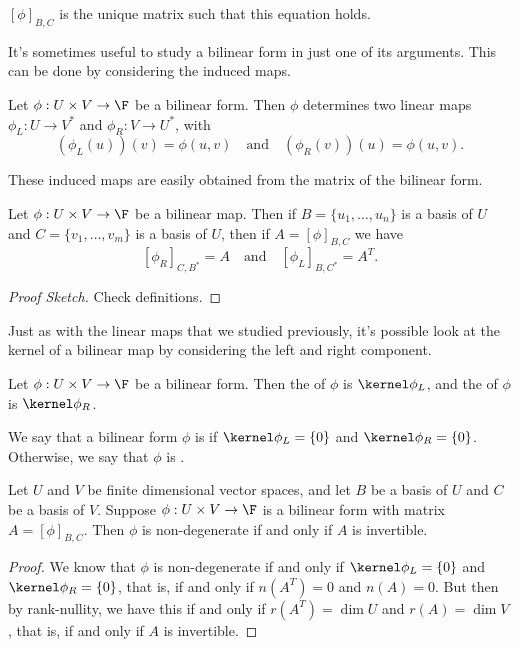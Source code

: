 \begin{remark}
    $[\phi]_{B, C}$ is the unique matrix such that this equation holds.
\end{remark}

It's sometimes useful to study a bilinear form in just one of its arguments. This can be done by considering the induced maps.

\begin{definition}    
    Let $\phi: U \times V \rightarrow \F$ be a bilinear form. Then $\phi$ determines two linear maps $\phi_L: U \rightarrow V^*$ and $\phi_R: V\rightarrow U^*$, with
    $$
    (\phi_L(u))(v) = \phi(u, v) \quad \text{and} \quad (\phi_R(v))(u) = \phi(u, v).
    $$
\end{definition}

These induced maps are easily obtained from the matrix of the bilinear form.

\begin{lemma}
    Let $\phi: U \times V \rightarrow \F$ be a bilinear map.
    Then if $B = \{u_1, \dots, u_n\}$ is a basis of $U$ and $C = \{v_1, \dots, v_m\}$ is a basis of $U$, then if $A = [\phi]_{B, C}$ we have
    $$
    [\phi_R]_{C, B^*} = A \quad \text{and} \quad [\phi_L]_{B, C^*} = A^T.
    $$
\end{lemma}
\begin{proof}[Proof Sketch]
    Check definitions.
\end{proof}

Just as with the linear maps that we studied previously, it's possible look at the kernel of a bilinear map by considering the left and right component.

\begin{definition}
    Let $\phi: U \times V \rightarrow \F$ be a bilinear form. Then the  of $\phi$ is $\kernel \phi_L$, and the  of $\phi$ is $\kernel \phi_R$.
\end{definition}

\begin{definition}[Degeneracy]
    We say that a bilinear form $\phi$ is  if $\kernel \phi_L = \{0\}$ and $\kernel \phi_R = \{0\}$. Otherwise, we say that $\phi$ is . 
\end{definition}

\begin{lemma}
    Let $U$ and $V$ be finite dimensional vector spaces, and 
let $B$ be a basis of $U$ and $C$ be a basis of $V$. 
Suppose $\phi: U \times V \rightarrow \F$ is a bilinear form with matrix $A = [\phi]_{B, C}$. Then $\phi$ is non-degenerate if and only if $A$ is invertible.
\end{lemma}
\begin{proof}
    We know that $\phi$ is non-degenerate if and only if $\kernel \phi_L = \{0\}$ and $\kernel \phi_R = \{0\}$, that is, if and only if $n(A^T) = 0$ and $n(A) = 0$. But then by rank-nullity, we have this if and only if $r(A^T) = \dim U$ and $r(A) = \dim V$, that is, if and only if $A$ is invertible.
\end{proof}

